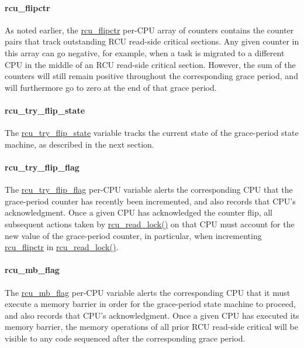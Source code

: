 \paragraph{rcu_flipctr}
\label{app:rcuimpl:rcu_flipctr}

As noted earlier, the \url{rcu_flipctr}
per-CPU array of counters contains the
counter pairs that track outstanding RCU read-side critical sections.
Any given counter in this array can go negative, for example, when
a task is migrated to a different CPU in the middle of an RCU
read-side critical section.
However, the sum of the counters will
still remain positive throughout the corresponding grace period, and will
furthermore go to zero at the end of that grace period.

\paragraph{rcu_try_flip_state}
\label{app:rcuimpl:rcu_try_flip_state}

The \url{rcu_try_flip_state} variable tracks the current state of
the grace-period state machine, as described in the next section.

\paragraph{rcu_try_flip_flag}
\label{app:rcuimpl:rcu_try_flip_flag}

The \url{rcu_try_flip_flag} per-CPU variable alerts the corresponding
CPU that the grace-period counter has recently been incremented, and
also records that CPU's acknowledgment.
Once a given CPU has acknowledged the counter flip, all subsequent actions
taken by \url{rcu_read_lock()} on that CPU must account for the
new value of the grace-period counter, in particular, when incrementing
\url{rcu_flipctr} in \url{rcu_read_lock()}.

\paragraph{rcu_mb_flag}
\label{app:rcuimpl:rcu_mb_flag}

The \url{rcu_mb_flag} per-CPU variable alerts the corresponding
CPU that it must execute a memory barrier in order for the grace-period
state machine to proceed, and also records that CPU's acknowledgment.
Once a given CPU has executed its memory barrier, the memory operations
of all prior RCU read-side critical will be visible to any code sequenced
after the corresponding grace period.


